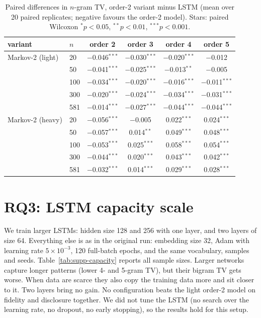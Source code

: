 \begin{table}[!t]
\caption{Paired differences in $n$-gram TV, order-2 variant minus LSTM (mean over 20 paired replicates; negative favours the order-2 model). Stars: paired Wilcoxon $^{*}p{<}0.05$, $^{**}p{<}0.01$, $^{***}p{<}0.001$.}
\label{tab:supp-rq3-ngrams-paired}
\centering\small
\begin{tabular}{llcccc}
\toprule
variant & $n$ & order 2 & order 3 & order 4 & order 5 \\
\midrule
Markov-2 (light) & 20 & $-$0.046$^{***}$ & $-$0.030$^{***}$ & $-$0.020$^{***}$ & $-$0.012 \\
 & 50 & $-$0.041$^{***}$ & $-$0.025$^{***}$ & $-$0.013$^{**}$ & $-$0.005 \\
 & 100 & $-$0.034$^{***}$ & $-$0.020$^{***}$ & $-$0.016$^{***}$ & $-$0.011$^{***}$ \\
 & 300 & $-$0.020$^{***}$ & $-$0.024$^{***}$ & $-$0.034$^{***}$ & $-$0.031$^{***}$ \\
 & 581 & $-$0.014$^{***}$ & $-$0.027$^{***}$ & $-$0.044$^{***}$ & $-$0.044$^{***}$ \\
\midrule
Markov-2 (heavy) & 20 & $-$0.056$^{***}$ & $-$0.005 & 0.022$^{***}$ & 0.024$^{***}$ \\
 & 50 & $-$0.057$^{***}$ & 0.014$^{**}$ & 0.049$^{***}$ & 0.048$^{***}$ \\
 & 100 & $-$0.053$^{***}$ & 0.025$^{***}$ & 0.058$^{***}$ & 0.054$^{***}$ \\
 & 300 & $-$0.044$^{***}$ & 0.020$^{***}$ & 0.043$^{***}$ & 0.042$^{***}$ \\
 & 581 & $-$0.032$^{***}$ & 0.014$^{***}$ & 0.029$^{***}$ & 0.028$^{***}$ \\
\bottomrule
\end{tabular}
\end{table}

\section{RQ3: LSTM capacity scale}
\label{supp:rq3-capacity}
We train larger LSTMs: hidden size 128 and 256 with one layer, and two layers of size 64. Everything else is as in the original run: embedding size 32, Adam with learning rate $5\times10^{-3}$, 120 full-batch epochs, and the same vocabulary, samples and seeds. Table~\ref{tab:supp-capacity} reports all sample sizes. Larger networks capture longer patterns (lower 4- and 5-gram TV), but their bigram TV gets worse. When data are scarce they also copy the training data more and sit closer to it. Two layers bring no gain. No configuration beats the light order-2 model on fidelity and disclosure together. We did not tune the LSTM (no search over the learning rate, no dropout, no early stopping), so the results hold for this setup.

